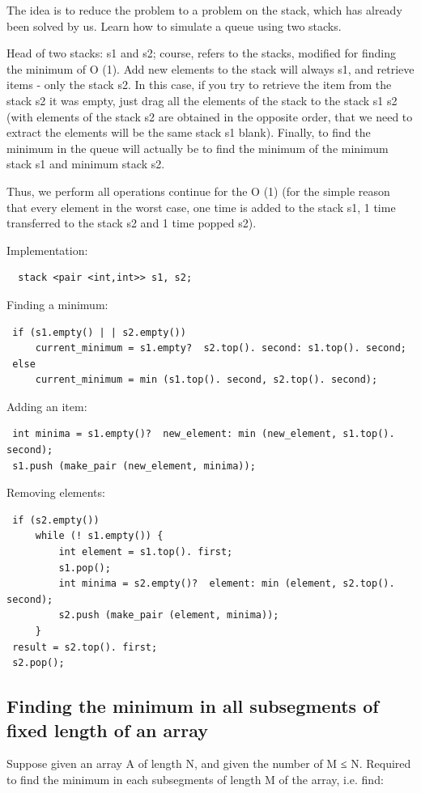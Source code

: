 The idea is to reduce the problem to a problem on the stack, which has already been solved by us. Learn how to simulate a queue using two stacks.

Head of two stacks: s1 and s2; course, refers to the stacks, modified for finding the minimum of O (1). Add new elements to the stack will always s1, and retrieve items - only the stack s2. In this case, if you try to retrieve the item from the stack s2 it was empty, just drag all the elements of the stack to the stack s1 s2 (with elements of the stack s2 are obtained in the opposite order, that we need to extract the elements will be the same stack s1 blank). Finally, to find the minimum in the queue will actually be to find the minimum of the minimum stack s1 and minimum stack s2.

Thus, we perform all operations continue for the O (1) (for the simple reason that every element in the worst case, one time is added to the stack s1, 1 time transferred to the stack s2 and 1 time popped s2).

Implementation:

\begin{verbatim}
  stack <pair <int,int>> s1, s2; 
\end{verbatim}
Finding a minimum: \begin{verbatim}
 if (s1.empty() | | s2.empty())
     current_minimum = s1.empty?  s2.top(). second: s1.top(). second;
 else
     current_minimum = min (s1.top(). second, s2.top(). second); 
\end{verbatim}

Adding an item: \begin{verbatim}
 int minima = s1.empty()?  new_element: min (new_element, s1.top(). second);
 s1.push (make_pair (new_element, minima)); 
\end{verbatim}

Removing elements: \begin{verbatim}
 if (s2.empty())
     while (! s1.empty()) {
         int element = s1.top(). first;
         s1.pop();
         int minima = s2.empty()?  element: min (element, s2.top(). second);
         s2.push (make_pair (element, minima));
     }
 result = s2.top(). first;
 s2.pop(); 
\end{verbatim}

\subsection{ Finding the minimum in all subsegments of fixed length of an array }
Suppose given an array A of length N, and given the number of M ≤ N. Required to find the minimum in each subsegments of length M of the array, i.e. find:

